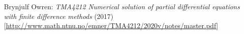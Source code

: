 \documentclass{article}
\begin{document}


\clearpage


\clearpage


\clearpage


\clearpage


\clearpage
\begin{thebibliography}{99}
Brynjulf Owren:
\textit{TMA4212 Numerical solution of partial differential equations with finite difference methods}
(2017)
[\url{http://www.math.ntnu.no/emner/TMA4212/2020v/notes/master.pdf}]

\end{thebibliography}
\end{document}

